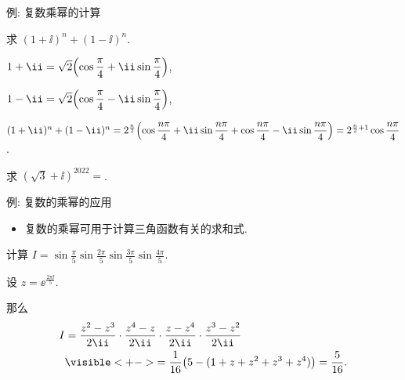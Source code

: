 \begin{frame}{例: 复数乘幂的计算}
	\onslide<+->
	\begin{example}[near]
		求 $(1+\ii)^n+(1-\ii )^n$.
	\end{example}
	\onslide<+->
	\begin{solution}[near]
		\begin{itemize*}
			\item \centering $1+\ii=\sqrt2\Bigl(\cos\dfrac\pi4+\ii\sin\dfrac\pi4\Bigr)$,
			\item \centering $1-\ii =\sqrt2\Bigl(\cos\dfrac\pi4-\ii \sin\dfrac\pi4\Bigr)$,
			\item \centering $(1+\ii)^n+(1-\ii )^n
				=2^{\frac n2}\Bigl(\cos\dfrac{n\pi}4+\ii\sin\dfrac{n\pi}4+\cos\dfrac{n\pi}4-\ii \sin\dfrac{n\pi}4\Bigr)
				=2^{\frac n2+1}\cos\dfrac{n\pi}4$.
		\end{itemize*}
	\end{solution}
	\onslide<+->
	\begin{exercise}[near]
		求 $(\sqrt3+\ii)^{2022}=$\fillblankframe[2cm]{$-2^{2022}$}.
	\end{exercise}
\end{frame}


\begin{frame}{例: 复数的乘幂的应用\noexer}
	\begin{itemize}
		\item 复数的乘幂可用于计算三角函数有关的求和式.
	\end{itemize}
	\onslide<+->
	\begin{example}[near]
		计算 $\displaystyle I =\sin\frac{\pi}5\sin\frac{2\pi}5\sin\frac{3\pi}5\sin\frac{4\pi}5$.
	\end{example}
	\onslide<+->
	\begin{solution}[near]
		\begin{itemize*}
			\item 设 $z=\ee^{\frac{2\pi\ii}5}$.
			\item 那么
			\begin{align*}
				I&=\frac{z^2-z^3}{2\ii}\cdot
					\frac{z^4-z}{2\ii}\cdot
					\frac{z-z^4}{2\ii}\cdot
					\frac{z^3-z^2}{2\ii}\\&
				\visible<+->{=\dfrac1{16}\bigl(5-(1+z+z^2+z^3+z^4)\bigr)
				=\dfrac{5}{16}.}
			\end{align*}
		\end{itemize*}
		\bigdel\bigdel
	\end{solution}
\end{frame}


